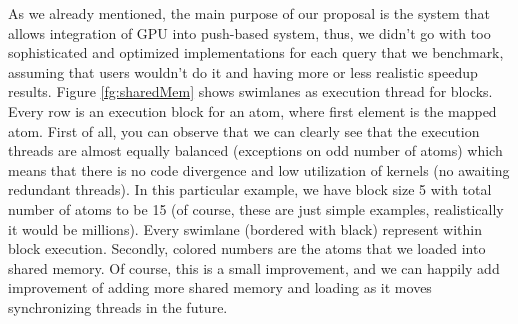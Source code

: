\documentclass[12pt,letterpaper]{report}
\begin{document}
\noindent\hspace{3em}As we already mentioned, the main purpose of our proposal is the system that allows integration of GPU into push-based system, thus, we didn't go with too sophisticated and optimized implementations for each query that we benchmark, assuming that users wouldn't do it and having more or less realistic speedup results. Figure \ref{fg:sharedMem} shows swimlanes as execution thread for blocks. Every row is an execution block for an atom, where first element is the mapped atom. First of all, you can observe that we can clearly see that the execution threads are almost equally balanced (exceptions on odd number of atoms) which means that there is no code divergence and low utilization of kernels (no awaiting redundant threads). In this particular example, we have block size 5 with total number of atoms to be 15 (of course, these are just simple examples, realistically it would be millions). Every swimlane (bordered with black) represent within block execution. Secondly, colored numbers are the atoms that we loaded into shared memory. Of course, this is a small improvement, and we can happily add improvement of adding more shared memory and loading as it moves synchronizing threads in the future.
\end{document}
